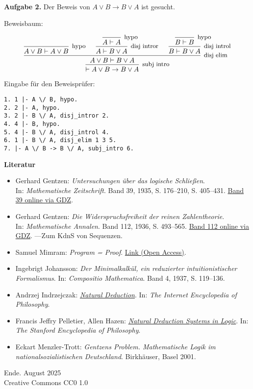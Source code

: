 \documentclass[8pt]{beamer}
\newcommand{\inote}[1]{{\small #1}}
\newcommand{\modest}[1]{{\small\color{gray}#1}}
\newcommand{\strong}[1]{\textsf{\textbf{#1}}}
\newcommand{\parspace}{\vspace{0.8em}}
\newcommand{\cond}{\rightarrow}
\begin{document}
\begin{frame}[t,fragile]
\vspace{3em}
\strong{Aufgabe 2.}
Der Beweis von $A\lor B\cond B\lor A$ ist gesucht.\pause

\parspace
Beweisbaum:

\[\begin{prooftree}
    \infer0[\inote{hypo}]{A\lor B\vdash A\lor B}
      \infer0[\inote{hypo}]{A\vdash A}
    \infer1[\inote{disj intror}]{A\vdash B\lor A}
      \infer0[\inote{hypo}]{B\vdash B}
    \infer1[\inote{disj introl}]{B\vdash B\lor A}
  \infer3[\inote{disj elim}]{A\lor B\vdash B\lor A}
\infer1[\inote{subj intro}]{\vdash A\lor B\cond B\lor A}
\end{prooftree}\]

\vspace{1em}
Eingabe für den Beweisprüfer:

\begin{lstlisting}[xleftmargin=4em]
1. 1 |- A \/ B, hypo.
2. 2 |- A, hypo.
3. 2 |- B \/ A, disj_intror 2.
4. 4 |- B, hypo.
5. 4 |- B \/ A, disj_introl 4.
6. 1 |- B \/ A, disj_elim 1 3 5.
7. |- A \/ B -> B \/ A, subj_intro 6.
\end{lstlisting}
\end{frame}

\begin{frame}[t]
\vspace{3em}
\strong{Literatur}
\begin{itemize}
\item Gerhard Gentzen: \emph{Untersuchungen über das logische Schließen}.\\
In: \emph{Mathematische Zeitschrift}. Band 39, 1935, S. 176--210, S. 405--431.
\href{https://gdz.sub.uni-goettingen.de/id/PPN266833020_0039}{Band 39 online via GDZ}.
\item Gerhard Gentzen: \emph{Die Widerspruchsfreiheit der reinen
Zahlentheorie}.\\
In: \emph{Mathematische Annalen}. Band 112, 1936, S. 493--565.
\href{https://gdz.sub.uni-goettingen.de/id/PPN235181684_0112}{Band 112 online via GDZ}.
---Zum KdnS von Sequenzen.
\item Samuel Mimram: \emph{Program = Proof}.
\href{https://www.lix.polytechnique.fr/Labo/Samuel.Mimram/publications/}{Link (Open Access)}.
\item Ingebrigt Johansson: \emph{Der Minimalkalkül, ein reduzierter
intuitionistischer Formalismus}. In: \emph{Compositio Mathematica}.
Band 4, 1937, S. 119--136.
\item Andrzej Indrzejczak: \href{https://iep.utm.edu/natural-deduction/}{\emph{Natural Deduction}}.
In: \emph{The Internet Encyclopedia of Philosophy}.
\item Francis Jeffry Pelletier, Allen Hazen:
\href{https://plato.stanford.edu/entries/natural-deduction/}{\emph{Natural Deduction Systems in Logic}}.
In: \emph{The Stanford Encyclopedia of Philosophy}.
\item Eckart Menzler-Trott: \emph{Gentzens Problem. Mathematische Logik
  im nationalsozialistischen Deutschland}. Birkhäuser, Basel 2001.
\end{itemize}
\end{frame}

\begin{frame}
Ende.
\vfill\hfill\modest{August 2025}\\
\hfill\modest{Creative Commons CC0 1.0}
\end{frame}
\end{document}
